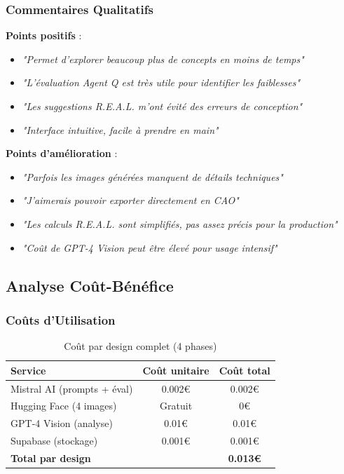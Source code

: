\subsubsection{Commentaires Qualitatifs}

\textbf{Points positifs} :
\begin{itemize}[leftmargin=*]
    \item \textit{"Permet d'explorer beaucoup plus de concepts en moins de temps"}
    \item \textit{"L'évaluation Agent Q est très utile pour identifier les faiblesses"}
    \item \textit{"Les suggestions R.E.A.L. m'ont évité des erreurs de conception"}
    \item \textit{"Interface intuitive, facile à prendre en main"}
\end{itemize}

\textbf{Points d'amélioration} :
\begin{itemize}[leftmargin=*]
    \item \textit{"Parfois les images générées manquent de détails techniques"}
    \item \textit{"J'aimerais pouvoir exporter directement en CAO"}
    \item \textit{"Les calculs R.E.A.L. sont simplifiés, pas assez précis pour la production"}
    \item \textit{"Coût de GPT-4 Vision peut être élevé pour usage intensif"}
\end{itemize}

\subsection{Analyse Coût-Bénéfice}

\subsubsection{Coûts d'Utilisation}

\begin{table}[H]
\centering
\caption{Coût par design complet (4 phases)}
\label{tab:costs}
\begin{tabular}{@{}lcc@{}}
\toprule
\textbf{Service} & \textbf{Coût unitaire} & \textbf{Coût total} \\ 
\midrule
Mistral AI (prompts + éval) & 0.002€ & 0.002€ \\
Hugging Face (4 images) & Gratuit & 0€ \\
GPT-4 Vision (analyse) & 0.01€ & 0.01€ \\
Supabase (stockage) & 0.001€ & 0.001€ \\
\midrule
\textbf{Total par design} & & \textbf{0.013€} \\
\bottomrule
\end{tabular}
\end{table}

